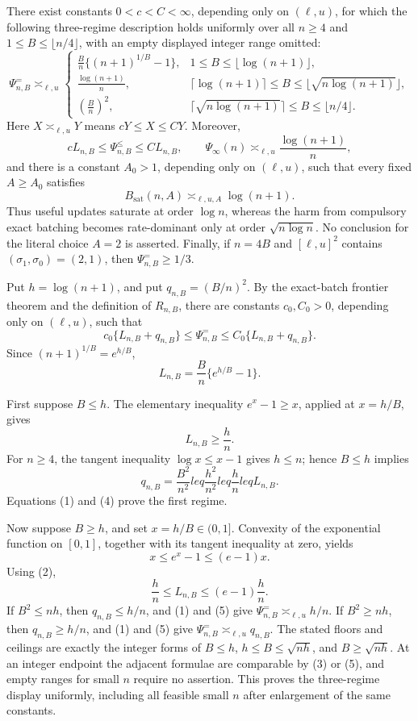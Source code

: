 There exist constants \(0<c<C<\infty\), depending only on \((\ell,u)\), for which the following three-regime description holds uniformly over all \(n\geq4\) and \(1\leq B\leq\lfloor n/4\rfloor\), with an empty displayed integer range omitted:
\[
\Psi^{=}_{n,B}\asymp_{\ell,u}
\begin{cases}
\displaystyle \frac{B}{n}\bigl\{(n+1)^{1/B}-1\bigr\},
&1\leq B\leq\lfloor\log(n+1)\rfloor,\\[6pt]
\displaystyle \frac{\log(n+1)}{n},
&\lceil\log(n+1)\rceil\leq B\leq
 \lfloor\sqrt{n\log(n+1)}\rfloor,\\[6pt]
\displaystyle \left(\frac{B}{n}\right)^2,
&\lceil\sqrt{n\log(n+1)}\rceil\leq B\leq\lfloor n/4\rfloor.
\end{cases}
\]
Here \(X\asymp_{\ell,u}Y\) means \(cY\leq X\leq CY\). Moreover,
\[
cL_{n,B}\leq\Psi^{\leq}_{n,B}\leq CL_{n,B},
\qquad
\Psi_\infty(n)\asymp_{\ell,u}\frac{\log(n+1)}{n},
\]
and there is a constant \(A_0>1\), depending only on \((\ell,u)\), such that every fixed \(A\geq A_0\) satisfies
\[
B_{\mathrm{sat}}(n,A)\asymp_{\ell,u,A}\log(n+1).
\]
Thus useful updates saturate at order \(\log n\), whereas the harm from compulsory exact batching becomes rate-dominant only at order \(\sqrt{n\log n}\). No conclusion for the literal choice \(A=2\) is asserted. Finally, if \(n=4B\) and \([\ell,u]^2\) contains \((\sigma_1,\sigma_0)=(2,1)\), then \(\Psi^{=}_{n,B}\geq1/3\).

Put \(h=\log(n+1)\), and put \(q_{n,B}=(B/n)^2\). By the exact-batch frontier theorem and the definition of \(R_{n,B}\), there are constants \(c_0,C_0>0\), depending only on \((\ell,u)\), such that
\[
c_0\{L_{n,B}+q_{n,B}\}
\leq \Psi^{=}_{n,B}
\leq C_0\{L_{n,B}+q_{n,B}\}.                    \tag{1}
\]
Since \((n+1)^{1/B}=e^{h/B}\),
\[
L_{n,B}=\frac{B}{n}\{e^{h/B}-1\}.               \tag{2}
\]

First suppose \(B\leq h\). The elementary inequality \(e^x-1\geq x\), applied at \(x=h/B\), gives
\[
L_{n,B}\geq \frac{h}{n}.                         \tag{3}
\]
For \(n\geq4\), the tangent inequality \(\log x\leq x-1\) gives \(h\leq n\); hence \(B\leq h\) implies
\[
q_{n,B}=\frac{B^2}{n^2}leq\frac{h^2}{n^2}leq\frac{h}{n}leq L_{n,B}. \tag{4}
\]
Equations (1) and (4) prove the first regime.

Now suppose \(B\geq h\), and set \(x=h/B\in(0,1]\). Convexity of the exponential function on \([0,1]\), together with its tangent inequality at zero, yields
\[
x\leq e^x-1\leq(e-1)x.
\]
Using (2),
\[
\frac{h}{n}\leq L_{n,B}\leq(e-1)\frac{h}{n}.     \tag{5}
\]
If \(B^2\leq nh\), then \(q_{n,B}\leq h/n\), and (1) and (5) give
\(\Psi^{=}_{n,B}\asymp_{\ell,u}h/n\). If \(B^2\geq nh\), then \(q_{n,B}\geq h/n\), and (1) and (5) give
\(\Psi^{=}_{n,B}\asymp_{\ell,u}q_{n,B}\). The stated floors and ceilings are exactly the integer forms of \(B\leq h\), \(h\leq B\leq\sqrt{nh}\), and \(B\geq\sqrt{nh}\). At an integer endpoint the adjacent formulae are comparable by (3) or (5), and empty ranges for small \(n\) require no assertion. This proves the three-regime display uniformly, including all feasible small \(n\) after enlargement of the same constants.

